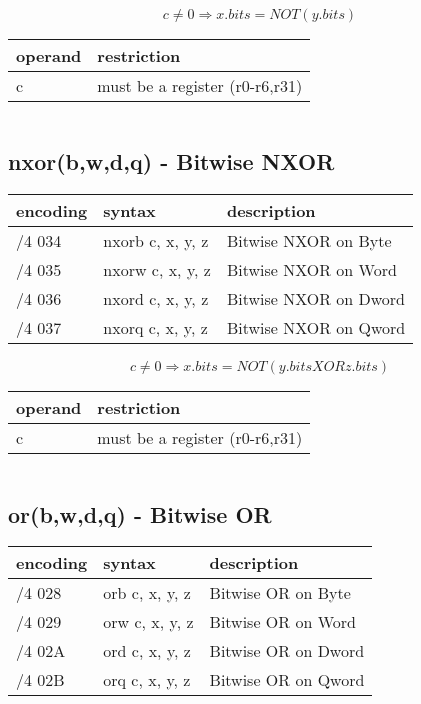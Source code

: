 \documentclass[letterpaper,10pt,openright,twoside,onecolumn]{book}
\begin{document}
  \begin{displaymath} c \neq 0 \Rightarrow x.bits = NOT( y.bits )\end{displaymath}

  \flushleft
  \begin{tabular}{|l|l|}
   \hline
    operand & restriction \\
   \hline
    c & must be a register (r0-r6,r31) \\
   \hline
  \end{tabular}
  \begin{verbatim}
  \end{verbatim}

\newpage\subsection{nxor(b,w,d,q) - Bitwise NXOR}
  \begin{tabular}{|l|l|l|}
   \hline
    encoding & syntax & description \\
   \hline
    /4 034 & nxorb c, x, y, z & Bitwise NXOR on Byte \\
    /4 035 & nxorw c, x, y, z & Bitwise NXOR on Word \\
    /4 036 & nxord c, x, y, z & Bitwise NXOR on Dword \\
    /4 037 & nxorq c, x, y, z & Bitwise NXOR on Qword \\
   \hline
  \end{tabular}

  \begin{displaymath} c \neq 0 \Rightarrow x.bits = NOT(y.bits XOR z.bits)\end{displaymath}

  \flushleft
  \begin{tabular}{|l|l|}
   \hline
    operand & restriction \\
   \hline
    c & must be a register (r0-r6,r31) \\
   \hline
  \end{tabular}
  \begin{verbatim}
  \end{verbatim}

\newpage\subsection{or(b,w,d,q) - Bitwise OR}
  \begin{tabular}{|l|l|l|}
   \hline
    encoding & syntax & description \\
   \hline
    /4 028 & orb c, x, y, z & Bitwise OR on Byte \\
    /4 029 & orw c, x, y, z & Bitwise OR on Word \\
    /4 02A & ord c, x, y, z & Bitwise OR on Dword \\
    /4 02B & orq c, x, y, z & Bitwise OR on Qword \\
   \hline
  \end{tabular}
\end{document}
